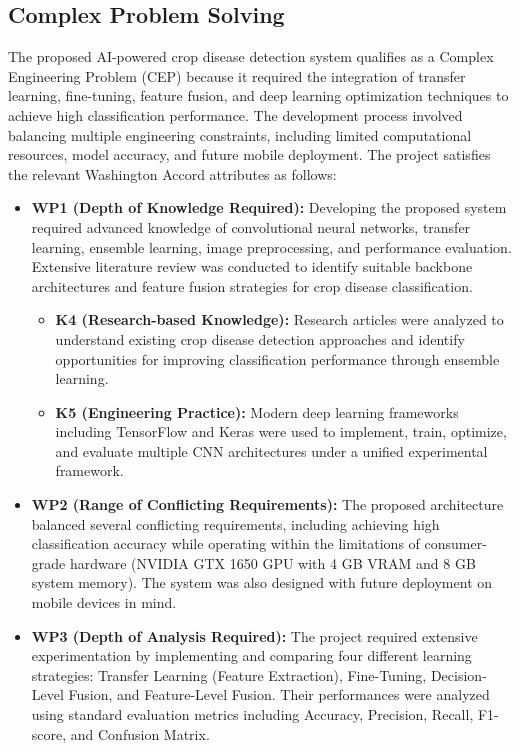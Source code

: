 \subsection{Complex Problem Solving}

The proposed AI-powered crop disease detection system qualifies as a Complex Engineering Problem (CEP) because it required the integration of transfer learning, fine-tuning, feature fusion, and deep learning optimization techniques to achieve high classification performance. The development process involved balancing multiple engineering constraints, including limited computational resources, model accuracy, and future mobile deployment. The project satisfies the relevant Washington Accord attributes as follows:

\begin{itemize}
    \item \textbf{WP1 (Depth of Knowledge Required):} Developing the proposed system required advanced knowledge of convolutional neural networks, transfer learning, ensemble learning, image preprocessing, and performance evaluation. Extensive literature review was conducted to identify suitable backbone architectures and feature fusion strategies for crop disease classification.
    
    \begin{itemize}
        \item \textbf{K4 (Research-based Knowledge):} Research articles were analyzed to understand existing crop disease detection approaches and identify opportunities for improving classification performance through ensemble learning.
        
        \item \textbf{K5 (Engineering Practice):} Modern deep learning frameworks including TensorFlow and Keras were used to implement, train, optimize, and evaluate multiple CNN architectures under a unified experimental framework.
    \end{itemize}

    \item \textbf{WP2 (Range of Conflicting Requirements):} The proposed architecture balanced several conflicting requirements, including achieving high classification accuracy while operating within the limitations of consumer-grade hardware (NVIDIA GTX 1650 GPU with 4 GB VRAM and 8 GB system memory). The system was also designed with future deployment on mobile devices in mind.

    \item \textbf{WP3 (Depth of Analysis Required):} The project required extensive experimentation by implementing and comparing four different learning strategies: Transfer Learning (Feature Extraction), Fine-Tuning, Decision-Level Fusion, and Feature-Level Fusion. Their performances were analyzed using standard evaluation metrics including Accuracy, Precision, Recall, F1-score, and Confusion Matrix.
\end{itemize}

